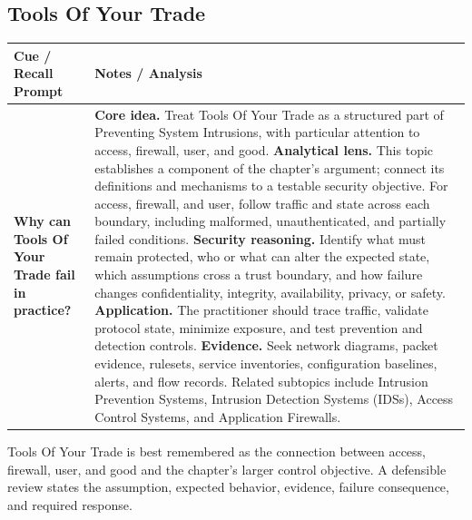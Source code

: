 \documentclass[11pt]{article}
\newcommand{\CornellHeader}{%
\rowcolor{Navy}\color{white}\bfseries Cue / Recall Prompt & \color{white}\bfseries Notes / Analysis\\\hline}
\newcommand{\CornellRow}[2]{%
\cellcolor{CueGray}\RaggedRight\textbf{#1} & \RaggedRight #2\\\hline}
\begin{document}
\subsection*{Tools Of Your Trade}
\begin{longtable}{>{\RaggedRight\arraybackslash}p{}|>{\RaggedRight\arraybackslash}p{}}
\CornellHeader
\CornellRow{Why can Tools Of Your Trade fail in practice?}{\textbf{Core idea.} Treat Tools Of Your Trade as a structured part of Preventing System Intrusions, with particular attention to access, firewall, user, and good. \textbf{Analytical lens.} This topic establishes a component of the chapter's argument; connect its definitions and mechanisms to a testable security objective. For access, firewall, and user, follow traffic and state across each boundary, including malformed, unauthenticated, and partially failed conditions. \textbf{Security reasoning.} Identify what must remain protected, who or what can alter the expected state, which assumptions cross a trust boundary, and how failure changes confidentiality, integrity, availability, privacy, or safety. \textbf{Application.} The practitioner should trace traffic, validate protocol state, minimize exposure, and test prevention and detection controls. \textbf{Evidence.} Seek network diagrams, packet evidence, rulesets, service inventories, configuration baselines, alerts, and flow records. Related subtopics include Intrusion Prevention Systems, Intrusion Detection Systems (IDSs), Access Control Systems, and Application Firewalls.}
\end{longtable}
\begin{topicsummary}
Tools Of Your Trade is best remembered as the connection between access, firewall, user, and good and the chapter's larger control objective. A defensible review states the assumption, expected behavior, evidence, failure consequence, and required response.
\end{topicsummary}
\end{document}
